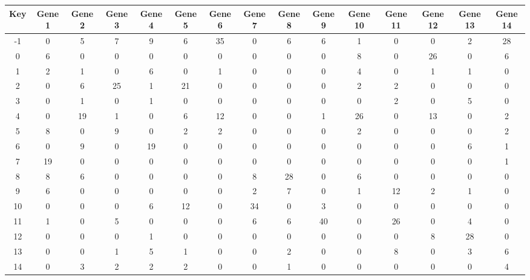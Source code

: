 \begin{tabular}{|c|c|c|c|c|c|c|c|c|c|c|c|c|c|c|}
\hline
Key & Gene 1 & Gene 2 & Gene 3 & Gene 4 & Gene 5 & Gene 6 & Gene 7 & Gene 8 & Gene 9 & Gene 10 & Gene 11 & Gene 12 & Gene 13 & Gene 14 \\
\hline
-1 & 0 & 5 & 7 & 9 & 6 & 35 & 0 & 6 & 6 & 1 & 0 & 0 & 2 & 28 \\
0 & 6 & 0 & 0 & 0 & 0 & 0 & 0 & 0 & 0 & 8 & 0 & 26 & 0 & 6 \\
1 & 2 & 1 & 0 & 6 & 0 & 1 & 0 & 0 & 0 & 4 & 0 & 1 & 1 & 0 \\
2 & 0 & 6 & 25 & 1 & 21 & 0 & 0 & 0 & 0 & 2 & 2 & 0 & 0 & 0 \\
3 & 0 & 1 & 0 & 1 & 0 & 0 & 0 & 0 & 0 & 0 & 2 & 0 & 5 & 0 \\
4 & 0 & 19 & 1 & 0 & 6 & 12 & 0 & 0 & 1 & 26 & 0 & 13 & 0 & 2 \\
5 & 8 & 0 & 9 & 0 & 2 & 2 & 0 & 0 & 0 & 2 & 0 & 0 & 0 & 2 \\
6 & 0 & 9 & 0 & 19 & 0 & 0 & 0 & 0 & 0 & 0 & 0 & 0 & 6 & 1 \\
7 & 19 & 0 & 0 & 0 & 0 & 0 & 0 & 0 & 0 & 0 & 0 & 0 & 0 & 1 \\
8 & 8 & 6 & 0 & 0 & 0 & 0 & 8 & 28 & 0 & 6 & 0 & 0 & 0 & 0 \\
9 & 6 & 0 & 0 & 0 & 0 & 0 & 2 & 7 & 0 & 1 & 12 & 2 & 1 & 0 \\
10 & 0 & 0 & 0 & 6 & 12 & 0 & 34 & 0 & 3 & 0 & 0 & 0 & 0 & 0 \\
11 & 1 & 0 & 5 & 0 & 0 & 0 & 6 & 6 & 40 & 0 & 26 & 0 & 4 & 0 \\
12 & 0 & 0 & 0 & 1 & 0 & 0 & 0 & 0 & 0 & 0 & 0 & 8 & 28 & 0 \\
13 & 0 & 0 & 1 & 5 & 1 & 0 & 0 & 2 & 0 & 0 & 8 & 0 & 3 & 6 \\
14 & 0 & 3 & 2 & 2 & 2 & 0 & 0 & 1 & 0 & 0 & 0 & 0 & 0 & 4 \\
\hline
\end{tabular}